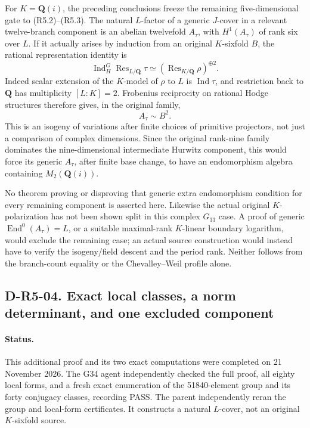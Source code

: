 For $K=\mathbf Q(i)$, the preceding conclusions freeze the remaining
five-dimensional gate to (R5.2)--(R5.3).
The natural $L$-factor of a generic $J$-cover in a relevant
twelve-branch component is an abelian twelvefold $A_\tau$, with
$H^1(A_\tau)$ of rank six over $L$.
If it actually arises by induction from an original $K$-sixfold
$B$, the rational representation identity is
\[
 \operatorname{Ind}_H^G\operatorname{Res}_{L/\mathbf Q}\tau
       \simeq
       \left(\operatorname{Res}_{K/\mathbf Q}\rho\right)^{\oplus2}.
                                                               \tag{R5.15}
\]
Indeed scalar extension of the $K$-model of $\rho$ to $L$ is
$\operatorname{Ind}\tau$, and restriction back to $\mathbf Q$
has multiplicity $[L:K]=2$.  Frobenius reciprocity on rational
Hodge structures therefore gives, in the original family,
\[
                              A_\tau\sim B^2.
                                                               \tag{R5.16}
\]
This is an isogeny of variations after finite choices of primitive
projectors, not just a comparison of complex dimensions.
Since the original rank-nine family dominates the nine-dimensional
intermediate Hurwitz component, this would force its generic
$A_\tau$, after finite base change, to have an endomorphism algebra
containing $M_2(\mathbf Q(i))$.

No theorem proving or disproving that generic extra endomorphism
condition for every remaining component is asserted here.
Likewise the actual original $K$-polarization has not been shown
split in this complex $G_{33}$ case.  A proof of generic
$\operatorname{End}^0(A_\tau)=L$, or a suitable maximal-rank
$K$-linear boundary logarithm, would exclude the remaining case;
an actual source construction would instead have to verify the
isogeny/field descent and the period rank.  Neither follows from
the branch-count equality or the Chevalley--Weil profile alone.

\subsection*{D-R5-04. Exact local classes, a norm determinant, and one excluded component}

\paragraph{Status.}
This additional proof and its two exact computations were completed
on 21 November 2026.  The G34 agent independently checked the full
proof, all eighty local forms, and a fresh exact enumeration of the
51840-element group and its forty conjugacy classes, recording PASS.
The parent independently reran the group and local-form certificates.
It constructs a natural $L$-cover, not an original $K$-sixfold source.

